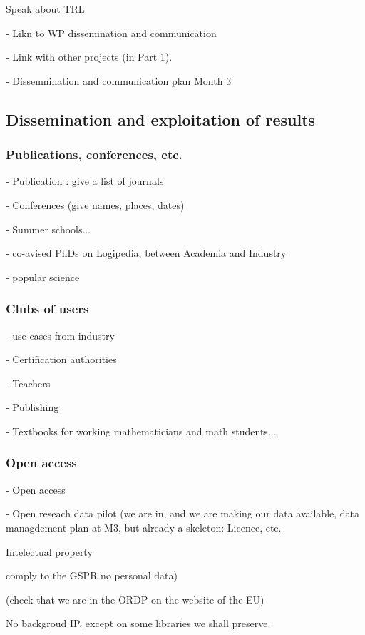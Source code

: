 {\color{red} Speak about TRL}

- Likn to WP dissemination and communication

- Link with other projects (in Part 1).

- Dissemnination and communication plan Month 3

\subsection{Dissemination and exploitation of results}
\label{sec:dissemination}

\subsubsection*{Publications, conferences, etc.}

- Publication : give a list of journals 

- Conferences (give names, places, dates)

- Summer schools...

- co-avised PhDs on Logipedia, between Academia and Industry

- popular science

\subsubsection*{Clubs of users}

- use cases from industry

- Certification authorities

- Teachers

- Publishing

- Textbooks for working mathematicians and math students...



\subsubsection*{Open access}

- Open access

- Open reseach data pilot (we are in, and we are making our data available,
data managdement plan at M3, but already a skeleton: Licence, etc.

Intelectual property

comply to the GSPR no personal data)

(check that we are in the ORDP on the website of the EU)

No backgroud IP, except on some libraries
we shall preserve.

